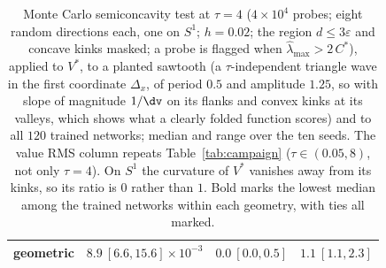 \begin{table}[!tbp]
\begin{tabular}{lccc}
geometric & $8.9\ [6.6,15.6]\times10^{-3}$ & $\bm{0.0\ [0.0,0.5]}$ & $\bm{1.1\ [1.1,2.3]}$ \\
\bottomrule
\end{tabular}
\caption{Monte Carlo semiconcavity test at $\tau = 4$ ($4\times10^{4}$
probes; eight random directions each, one on $S^{1}$; $h = 0.02$; the region
$d \le 3\varepsilon$ and concave kinks masked; a probe is flagged when
$\hat\lambda_{\max} > 2\,C^{*}$), applied to $V^{*}$, to a planted sawtooth (a
$\tau$-independent triangle wave in the first coordinate $\Delta_{x}$, of
period $0.5$ and amplitude $1.25$, so with slope of magnitude $1/\dv$ on its
flanks and convex kinks at its valleys, which shows what a clearly folded
function scores) and to all $120$ trained networks; median and range over the
ten seeds.  The value RMS column repeats Table~\ref{tab:campaign}
($\tau \in (0.05, 8)$, not only $\tau = 4$).  On $S^{1}$ the curvature of
$V^{*}$ vanishes away from its kinks, so its ratio is $0$ rather than $1$.
Bold marks the lowest median among the trained networks within each
geometry, with ties all marked.}
\label{tab:cert}
\end{table}

